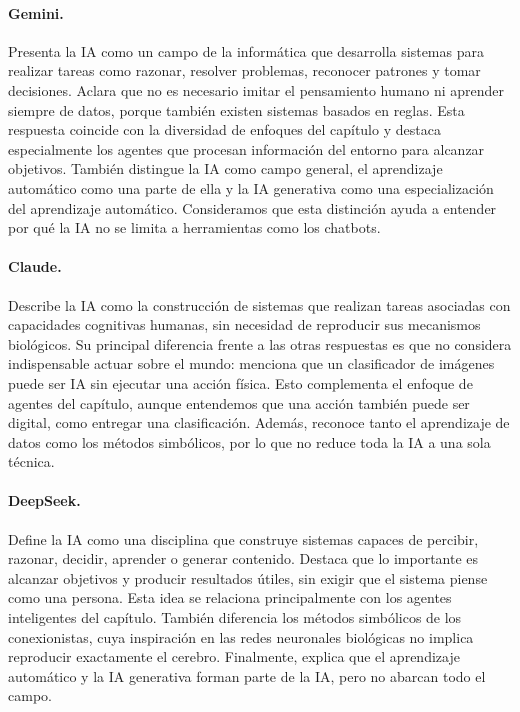 \documentclass[14pt,twoside]{article}
\begin{document}
\paragraph{Gemini.}
Presenta la IA como un campo de la informática que desarrolla sistemas para realizar tareas como razonar, resolver problemas, reconocer patrones y tomar decisiones. Aclara que no es necesario imitar el pensamiento humano ni aprender siempre de datos, porque también existen sistemas basados en reglas. Esta respuesta coincide con la diversidad de enfoques del capítulo y destaca especialmente los agentes que procesan información del entorno para alcanzar objetivos. También distingue la IA como campo general, el aprendizaje automático como una parte de ella y la IA generativa como una especialización del aprendizaje automático. Consideramos que esta distinción ayuda a entender por qué la IA no se limita a herramientas como los chatbots.

\paragraph{Claude.}
Describe la IA como la construcción de sistemas que realizan tareas asociadas con capacidades cognitivas humanas, sin necesidad de reproducir sus mecanismos biológicos. Su principal diferencia frente a las otras respuestas es que no considera indispensable actuar sobre el mundo: menciona que un clasificador de imágenes puede ser IA sin ejecutar una acción física. Esto complementa el enfoque de agentes del capítulo, aunque entendemos que una acción también puede ser digital, como entregar una clasificación. Además, reconoce tanto el aprendizaje de datos como los métodos simbólicos, por lo que no reduce toda la IA a una sola técnica.

\paragraph{DeepSeek.}
Define la IA como una disciplina que construye sistemas capaces de percibir, razonar, decidir, aprender o generar contenido. Destaca que lo importante es alcanzar objetivos y producir resultados útiles, sin exigir que el sistema piense como una persona. Esta idea se relaciona principalmente con los agentes inteligentes del capítulo. También diferencia los métodos simbólicos de los conexionistas, cuya inspiración en las redes neuronales biológicas no implica reproducir exactamente el cerebro. Finalmente, explica que el aprendizaje automático y la IA generativa forman parte de la IA, pero no abarcan todo el campo.
\end{document}
